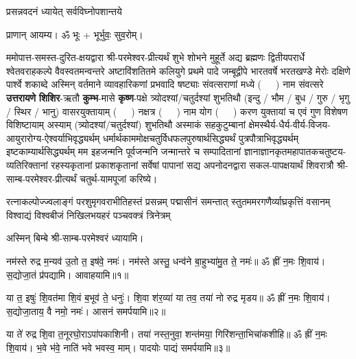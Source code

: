 

{प्रसन्नवदनं ध्यायेत् सर्वविघ्नोपशान्तये}
 
प्राणान्  आयम्य।  ॐ भूः + भूर्भुवः॒ सुव॒रोम्।

ममोपात्त-समस्त-दुरित-क्षयद्वारा श्री-परमेश्वर-प्रीत्यर्थं शुभे शोभने मुहूर्ते अद्य ब्रह्मणः
द्वितीयपरार्धे श्वेतवराहकल्पे वैवस्वतमन्वन्तरे अष्टाविंशतितमे कलियुगे प्रथमे पादे
जम्बूद्वीपे भारतवर्षे भरतखण्डे मेरोः दक्षिणे पार्श्वे शकाब्दे अस्मिन् वर्तमाने व्यावहारिकणां
 प्रभवादि षष्ट्याः संवत्सराणां मध्ये \mbox{(~~~)} नाम संवत्सरे \textbf{उत्तरायणे} 
\textbf{शिशिर}-ऋतौ  \textbf{कुम्भ}-मासे \textbf{कृष्ण}-पक्षे त्र्योदश्यां/चतुर्दश्यां शुभतिथौ
(इन्दु / भौम / बुध / गुरु / भृगु / स्थिर / भानु) वासरयुक्तायाम्
\mbox{(~~~)} नक्षत्र \mbox{(~~~)} नाम  योग  \mbox{(~~~)} करण युक्तायां च एवं गुण विशेषण विशिष्टायाम्
अस्याम् (त्र्योदश्यां/चतुर्दश्यां) शुभतिथौ 
अस्माकं सहकुटुम्बानां क्षेमस्थैर्य-धैर्य-वीर्य-विजय-आयुरारोग्य-ऐश्वर्याभिवृद्ध्यर्थम्
 धर्मार्थकाममोक्ष\-चतुर्विधफलपुरुषार्थसिद्ध्यर्थं पुत्रपौत्राभि\-वृद्ध्यर्थम् इष्टकाम्यार्थसिद्ध्यर्थम्
मम इहजन्मनि पूर्वजन्मनि जन्मान्तरे च सम्पादितानां ज्ञानाज्ञानकृतमहा\-पातकचतुष्टय-व्यतिरिक्तानां रहस्यकृतानां प्रकाशकृतानां सर्वेषां पापानां सद्य अपनोदनद्वारा सकल-पापक्षयार्थं शिवरात्रौ श्री-साम्ब-परमेश्वर-प्रीत्यर्थं चतुर्थ-यामपूजां करिष्ये।


{रत्नाकल्पोज्ज्वलाङ्गं परशुमृगवराभीतिहस्तं प्रसन्नम्}
{पद्मासीनं समन्तात् स्तुतममरगणैर्व्याघ्रकृत्तिं वसानम्}
{विश्वाद्यं विश्वबीजं निखिलभयहरं पञ्चवक्त्रं त्रिनेत्रम्}

अस्मिन् बिम्बे श्री-साम्ब-परमेश्वरं ध्यायामि। 

नम॑स्ते रुद्र म॒न्यव॑ उ॒तो त॒ इष॑वे॒ नमः॑। नम॑स्ते अस्तु॒ धन्व॑ने बा॒हुभ्या॑मु॒त ते॒ नमः॑॥ ॐ ह्रीं न॒मः शि॒वाय॑। स॒द्योजा॒तं प्र॑पद्यामि। आवाहयामि॥१॥

या त॒ इषुः॑ शि॒वत॑मा शि॒वं ब॒भूव॑ ते॒ धनुः॑। शि॒वा श॑र॒व्या॑ या तव॒ तया॑ नो रुद्र मृडय॥ ॐ ह्रीं न॒मः शि॒वाय॑। स॒द्योजा॒ताय॒ वै नमो॒ नमः॑। आसनं समर्पयामि॥२॥

या ते॑ रुद्र शि॒वा त॒नूरघो॒राऽपा॑पकाशिनी। तया॑ नस्त॒नुवा॒ शन्त॑मया॒ गिरि॑शन्ता॒\-भिचा॑कशीहि॥ ॐ ह्रीं न॒मः शि॒वाय॑। भ॒वे भ॑वे॒ नाति॑ भवे भवस्व॒ माम्। पादयोः पाद्यं समर्पयामि॥३॥

